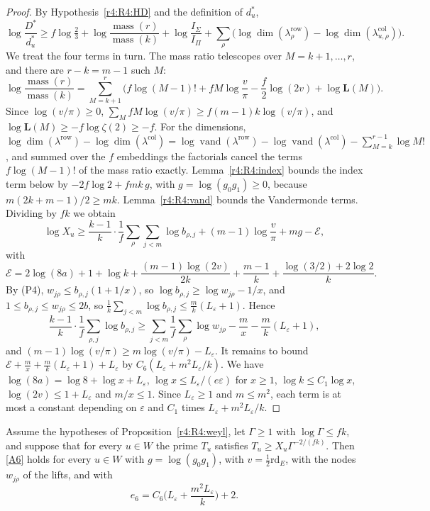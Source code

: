\begin{proof}
By Hypothesis~\ref{r4:R4:HD} and the definition of $d^*_u$,
\[
\log\frac{D^*}{d^*_u}\ge f\log\tfrac23+\log\frac{\operatorname{mass}(r)}{\operatorname{mass}(k)}+\log\frac{I_\Sigma}{I_\Pi}+\sum_\rho\big(\log\dim(\lambda^{\mathrm{row}}_\rho)-\log\dim(\lambda^{\mathrm{col}}_{u,\rho})\big).
\]
We treat the four terms in turn. The mass ratio telescopes over $M=k+1,\dots,r$, and there are $r-k=m-1$ such $M$:
\[
\log\frac{\operatorname{mass}(r)}{\operatorname{mass}(k)}=\sum_{M=k+1}^r\Big(f\log(M-1)!+fM\log\frac v\pi-\frac f2\log(2v)+\log\mathbf L(M)\Big).
\]
Since $\log(v/\pi)\ge0$, $\sum_MfM\log(v/\pi)\ge f(m-1)k\log(v/\pi)$, and $\log\mathbf L(M)\ge-f\log\zeta(2)\ge-f$. For the dimensions, $\log\dim(\lambda^{\mathrm{row}})-\log\dim(\lambda^{\mathrm{col}})=\log\operatorname{vand}(\lambda^{\mathrm{row}})-\log\operatorname{vand}(\lambda^{\mathrm{col}})-\sum_{M=k}^{r-1}\log M!$, and summed over the $f$ embeddings the factorials cancel the terms $f\log(M-1)!$ of the mass ratio exactly. Lemma~\ref{r4:R4:index} bounds the index term below by $-2f\log2+fmk\,g$, with $g=\log(g_0g_1)\ge0$, because $m(2k+m-1)/2\ge mk$. Lemma~\ref{r4:R4:vand} bounds the Vandermonde terms. Dividing by $fk$ we obtain
\[
\log X_u\ge\frac{k-1}{k}\cdot\frac1f\sum_\rho\sum_{j<m}\log b_{\rho,j}+(m-1)\log\frac v\pi+mg-\mathcal E,
\]
with
\[
\mathcal E=2\log(8a)+1+\log k+\frac{(m-1)\log(2v)}{2k}+\frac{m-1}k+\frac{\log(3/2)+2\log2}k .
\]
By (P4), $w_{j\rho}\le b_{\rho,j}(1+1/x)$, so $\log b_{\rho,j}\ge\log w_{j\rho}-1/x$, and $1\le b_{\rho,j}\le w_{j\rho}\le2b$, so $\frac1k\sum_{j<m}\log b_{\rho,j}\le\frac mk(L_\varepsilon+1)$. Hence
\[
\frac{k-1}k\cdot\frac1f\sum_{\rho,j}\log b_{\rho,j}\ge\sum_{j<m}\frac1f\sum_\rho\log w_{j\rho}-\frac mx-\frac mk(L_\varepsilon+1),
\]
and $(m-1)\log(v/\pi)\ge m\log(v/\pi)-L_\varepsilon$. It remains to bound $\mathcal E+\frac mx+\frac mk(L_\varepsilon+1)+L_\varepsilon$ by $C_6(L_\varepsilon+m^2L_\varepsilon/k)$. We have $\log(8a)=\log8+\log x+L_\varepsilon$, $\log x\le L_\varepsilon/(e\varepsilon)$ for $x\ge1$, $\log k\le C_1\log x$, $\log(2v)\le1+L_\varepsilon$ and $m/x\le1$. Since $L_\varepsilon\ge1$ and $m\le m^2$, each term is at most a constant depending on $\varepsilon$ and $C_1$ times $L_\varepsilon+m^2L_\varepsilon/k$.
\end{proof}

\begin{theorem}\label{r4:R4:A6}
Assume the hypotheses of Proposition~\ref{r4:R4:weyl}, let $\Gamma\ge1$ with $\log\Gamma\le fk$, and suppose that for every $u\in W$ the prime $T_u$ satisfies $T_u\ge X_u\Gamma^{-2/(fk)}$. Then \eqref{A6} holds for every $u\in W$ with $g=\log(g_0g_1)$, with $v=\frac12\mathrm{rd}_E$, with the nodes $w_{j\rho}$ of the lifts, and with
\[
e_6=C_6\Big(L_\varepsilon+\frac{m^2L_\varepsilon}k\Big)+2 .
\]
\end{theorem}

